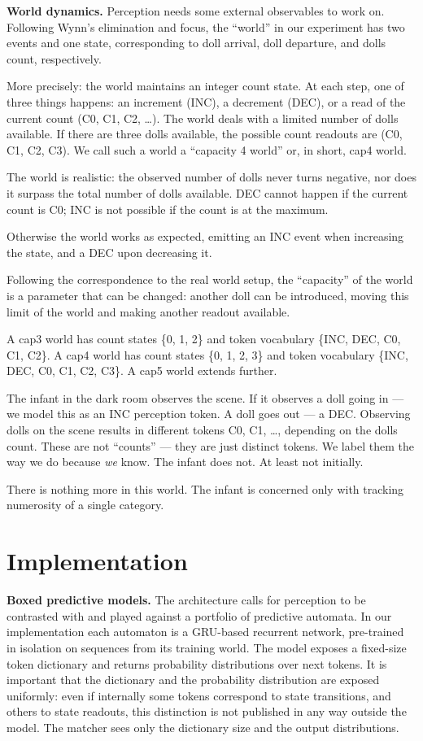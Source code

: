\documentclass[12pt, a4paper]{article}
\begin{document}
\textbf{World dynamics.} Perception needs some external observables to work
on. Following Wynn's elimination and focus, the ``world'' in our experiment has
two events and one state, corresponding to doll arrival, doll departure, and
dolls count, respectively.

More precisely: the world maintains an integer count state. At each step, one
of three things happens: an increment (INC), a decrement (DEC), or a read of
the current count (C0, C1, C2, \ldots). The world deals with a limited number
of dolls available. If there are three dolls available, the possible count
readouts are (C0, C1, C2, C3). We call such a world a ``capacity 4 world'' or,
in short, cap4 world.

The world is realistic: the observed number of dolls never turns negative, nor
does it surpass the total number of dolls available. DEC cannot happen if the
current count is C0; INC is not possible if the count is at the maximum.

Otherwise the world works as expected, emitting an INC event when increasing
the state, and a DEC upon decreasing it.

Following the correspondence to the real world setup, the ``capacity'' of the
world is a parameter that can be changed: another doll can be introduced,
moving this limit of the world and making another readout available.

A cap3 world has count states \{0, 1, 2\} and token vocabulary \{INC, DEC, C0,
C1, C2\}. A cap4 world has count states \{0, 1, 2, 3\} and token vocabulary
\{INC, DEC, C0, C1, C2, C3\}. A cap5 world extends further.

The infant in the dark room observes the scene. If it observes a doll going
in --- we model this as an INC perception token. A doll goes out --- a DEC.
Observing dolls on the scene results in different tokens C0, C1, \ldots,
depending on the dolls count. These are not ``counts'' --- they are just
distinct tokens. We label them the way we do because \textit{we} know. The
infant does not. At least not initially.

There is nothing more in this world. The infant is concerned only with tracking
numerosity of a single category.

\section{Implementation}
\label{sec:implementation}

\textbf{Boxed predictive models.} The architecture calls for perception to be
contrasted with and played against a portfolio of predictive automata. In our
implementation each automaton is a GRU-based recurrent network, pre-trained in
isolation on sequences from its training world. The model exposes a fixed-size
token dictionary and returns probability distributions over next tokens. It is
important that the dictionary and the probability distribution are exposed
uniformly: even if internally some tokens correspond to state transitions, and
others to state readouts, this distinction is not published in any way outside
the model. The matcher sees only the dictionary size and the output
distributions.
\end{document}
